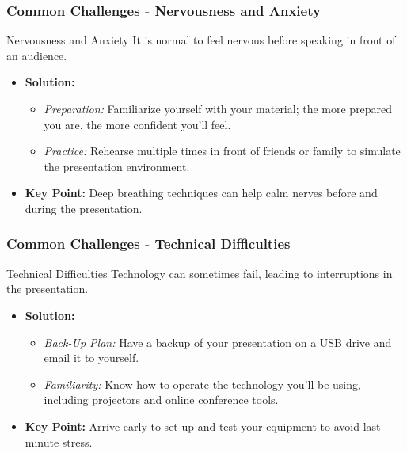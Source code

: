 \documentclass[aspectratio=169]{beamer}
\begin{document}
\begin{frame}[fragile]
  \frametitle{Common Challenges - Nervousness and Anxiety}
  \begin{block}{Nervousness and Anxiety}
    It is normal to feel nervous before speaking in front of an audience.
  \end{block}
  \begin{itemize}
    \item \textbf{Solution:}
    \begin{itemize}
      \item \textit{Preparation:} Familiarize yourself with your material; the more prepared you are, the more confident you'll feel.
      \item \textit{Practice:} Rehearse multiple times in front of friends or family to simulate the presentation environment.
    \end{itemize}
    \item \textbf{Key Point:} Deep breathing techniques can help calm nerves before and during the presentation.
  \end{itemize}
\end{frame}

\begin{frame}[fragile]
  \frametitle{Common Challenges - Technical Difficulties}
  \begin{block}{Technical Difficulties}
    Technology can sometimes fail, leading to interruptions in the presentation.
  \end{block}
  \begin{itemize}
    \item \textbf{Solution:}
    \begin{itemize}
      \item \textit{Back-Up Plan:} Have a backup of your presentation on a USB drive and email it to yourself.
      \item \textit{Familiarity:} Know how to operate the technology you’ll be using, including projectors and online conference tools.
    \end{itemize}
    \item \textbf{Key Point:} Arrive early to set up and test your equipment to avoid last-minute stress.
  \end{itemize}
\end{frame}
\end{document}
